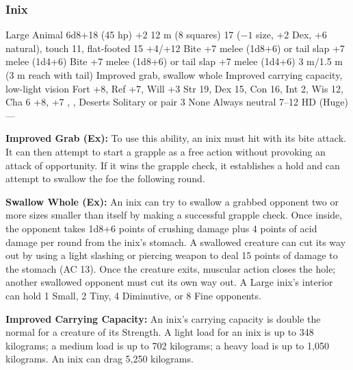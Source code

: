\subsubsection{Inix}
\begin{MonsterStats}
{Large Animal}
{6d8+18 (45 hp)}
{+2}
{12 m (8 squares)}
{17 ($-1$ size, +2 Dex, +6 natural), touch 11, flat-footed 15}
{+4/+12}
{Bite +7 melee (1d8+6) or tail slap +7 melee (1d4+6)}
{Bite +7 melee (1d8+6) or tail slap +7 melee (1d4+6)}
{3 m/1.5 m (3 m reach with tail)}
{Improved grab, swallow whole}
{Improved carrying capacity, low-light vision}
{Fort +8, Ref +7, Will +3}
{Str 19, Dex 15, Con 16, Int 2, Wis 12, Cha 6}
{ +8,  +7}
{, , }
{Deserts}
{Solitary or pair}
{3}
{None}
{Always neutral}
{7--12 HD (Huge)}
{---}
\end{MonsterStats}

\textbf{Improved Grab (Ex):} To use this ability, an inix must hit with its bite attack. It can then attempt to start a grapple as a free action without provoking an attack of opportunity. If it wins the grapple check, it establishes a hold and can attempt to swallow the foe the following round.

\textbf{Swallow Whole (Ex):} An inix can try to swallow a grabbed opponent two or more sizes smaller than itself by making a successful grapple check. Once inside, the opponent takes 1d8+6 points of crushing damage plus 4 points of acid damage per round from the inix's stomach. A swallowed creature can cut its way out by using a light slashing or piercing weapon to deal 15 points of damage to the stomach (AC 13). Once the creature exits, muscular action closes the hole; another swallowed opponent must cut its own way out. A Large inix's interior can hold 1 Small, 2 Tiny, 4 Diminutive, or 8 Fine opponents.

\textbf{Improved Carrying Capacity:} An inix's carrying capacity is double the normal for a creature of its Strength. A light load for an inix is up to 348 kilograms; a medium load is up to 702 kilograms; a heavy load is up to 1,050 kilograms. An inix can drag 5,250 kilograms.
